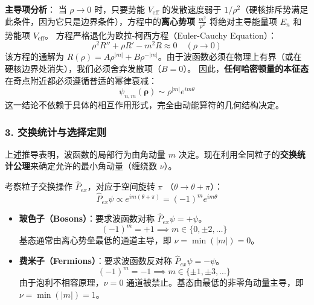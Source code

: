\documentclass[a4paper,12pt]{article}
\begin{document}
\textbf{主导项分析}：
当 $\rho \to 0$ 时，只要势能 $V_{\text{eff}}$ 的发散速度弱于 $1/\rho^2$（硬核排斥势满足此条件，因为它只是边界条件），方程中的\textbf{离心势项} $\frac{m^2}{\rho^2}$ 将绝对主导能量项 $E_n$ 和势能项 $V_{\text{eff}}$。
方程严格退化为欧拉-柯西方程（Euler-Cauchy Equation）：
\begin{equation}
    \rho^2 R'' + \rho R' - m^2 R \approx 0 \quad (\rho \to 0)
\end{equation}
该方程的通解为 $R(\rho) = A \rho^{|m|} + B \rho^{-|m|}$。由于波函数必须在物理上有界（或在硬核边界处消失），我们必须舍弃发散项（$B=0$）。
因此，\textbf{任何哈密顿量的本征态}在奇点附近都必须遵循普适的幂律衰减：
\begin{equation}
    \psi_{n,m}(\boldsymbol{\rho}) \sim \rho^{|m|} e^{im\theta}
    \label{eq:asymptotic_behavior}
\end{equation}
这一结论不依赖于具体的相互作用形式，完全由动能算符的几何结构决定。

\subsubsection{3. 交换统计与选择定则}

上述推导表明，波函数的局部行为由角动量 $m$ 决定。现在利用全同粒子的\textbf{交换统计公理}来确定允许的最小角动量（缠绕数 $\nu$）。

考察粒子交换操作 $\hat{P}_{ex}$，对应于空间旋转 $\pi$ （$\theta \to \theta + \pi$）：
\begin{equation}
    \hat{P}_{ex} \psi \propto e^{im(\theta+\pi)} = (-1)^m e^{im\theta}
\end{equation}

\begin{itemize}
    \item \textbf{玻色子（Bosons）}：要求波函数对称 $\hat{P}_{ex} \psi = +\psi$。
    \begin{equation}
        (-1)^m = +1 \implies m \in \{0, \pm 2, \dots\}
    \end{equation}
    基态通常由离心势垒最低的通道主导，即 $\nu = \min(|m|) = 0$。

    \item \textbf{费米子（Fermions）}：要求波函数反对称 $\hat{P}_{ex} \psi = -\psi$。
    \begin{equation}
        (-1)^m = -1 \implies m \in \{\pm 1, \pm 3, \dots\}
    \end{equation}
    由于泡利不相容原理，$\nu=0$ 通道被禁止。基态由最低的非零角动量主导，即 $\nu = \min(|m|) = 1$。
\end{itemize}
\end{document}
